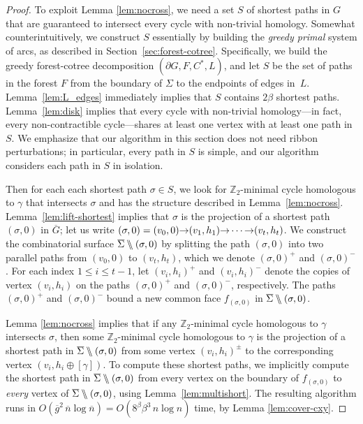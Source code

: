 \documentclass[letterpaper,review]{siamart190516}
\def\arcto{\mathord\shortrightarrow}
\def\Z{\mathbb{Z}}
\def\snip{\mathbin{\raisebox{0.15ex}{\rotatebox[origin=c]{60}{\Rightscissors}\!}}}
\def\snip{\mathbin{\backslash\!\!\backslash}}
\def\cycle{\gamma}
\def\Sigmabar{\overline{\smash{\Sigma}\vphantom{t}}}
\def\nbar{\overline{n}}
\def\gbar{\overline{g}}
\def\rnote#1{\color{red}Review: #1 \color{black}}
\def\jnote#1{\textcolor{orange}{Jeff: #1}}
\begin{document}
{\begin{proof}
To exploit Lemma \ref{lem:nocross}, we need a set $S$ of shortest paths in $G$ that are guaranteed to intersect every cycle with non-trivial homology.  Somewhat counterintuitively, we construct $S$ essentially by building the \emph{greedy primal} system of arcs, as described in Section~\ref{sec:forest-cotree}.  Specifically, we build the greedy forest-cotree decomposition $(\partial G, F, C^*, L)$, and let $S$ be the set of paths in the forest $F$ from the boundary of $\Sigma$ to the endpoints of edges in~$L$.  Lemma~\ref{lem:L_edges} immediately implies that $S$ contains $2\beta$ shortest paths.  Lemma~\ref{lem:disk} implies that every cycle with non-trivial homology---in fact, every non-contractible cycle---shares at least one vertex with at least one path in $S$.  We emphasize that our algorithm in this section does not need ribbon perturbations; in particular, every path in $S$ is simple, and our algorithm considers each path in $S$ in isolation.

Then for each each shortest path $\sigma\in S$, we look for $\Z_2$-minimal cycle homologous to $\gamma$ that intersects $\sigma$ and has the structure described in Lemma~\ref{lem:nocross}.  Lemma~\ref{lem:lift-shortest} implies that $\sigma$ is the projection of a shortest path $(\sigma,0)$ in $\overline{G}$; let us write $(\sigma,0) = (v_0,0) \arcto (v_1,h_1) \arcto\allowbreak \cdots\arcto (v_t, h_t)$.  We construct the combinatorial surface $\Sigmabar\snip(\sigma,0)$ by splitting the path $(\sigma,0)$ into two parallel paths from $(v_0,0)$ to $(v_t,h_t)$, which we denote  $(\sigma,0)^+$ and $(\sigma,0)^-$.  For each index $1\le i\le t-1$, let $(v_i,h_i)^+$ and $(v_i,h_i)^-$ denote the copies of vertex $(v_i,h_i)$  on the paths $(\sigma,0)^+$ and $(\sigma,0)^-$, respectively.  The paths $(\sigma,0)^+$ and $(\sigma,0)^-$ bound a new common face $f_{(\sigma,0)}$ in $\Sigmabar\snip(\sigma,0)$.

Lemma \ref{lem:nocross} implies that if any $\Z_2$-minimal cycle homologous to $\cycle$ intersects $\sigma$, then some $\Z_2$-minimal cycle homologous to $\cycle$ is the projection of a shortest path in $\Sigmabar\snip(\sigma,0)$ from some vertex $(v_i,h_i)^\pm$ to the corresponding vertex $(v_i, h_i\oplus[\cycle])$.  To compute these shortest paths, we implicitly compute the shortest path in $\Sigmabar\snip(\sigma,0)$ from every vertex on the boundary of $f_{(\sigma,0)}$ to \emph{every} vertex of $\Sigmabar\snip(\sigma,0)$, using Lemma~\ref{lem:multishort}.
The resulting algorithm runs in $O(\gbar^2\,\nbar \log \nbar) = O(8^\beta \beta^3\, n\log n)$ time, by Lemma \ref{lem:cover-cxy}.
\end{proof}
%

}
\end{document}
